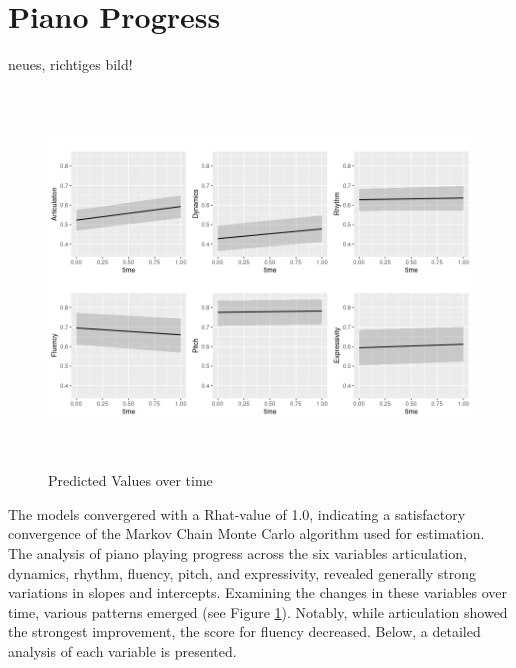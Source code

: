 \section{Piano Progress}
\label{cap:PianoProgress}

neues, richtiges bild!

\begin{figure}[h]
	\centering
	\includegraphics[width=15cm,height=10cm,keepaspectratio]{pred_vals}
	\caption{Predicted Values over time}
	\label{fig:PredVals}
\end{figure}

The models convergered with a Rhat-value of 1.0, indicating a satisfactory convergence of the Markov Chain Monte Carlo algorithm used for estimation. The analysis of piano playing progress across the six variables articulation, dynamics, rhythm, fluency, pitch, and expressivity, revealed generally strong variations in slopes and intercepts. Examining the changes in these variables over time, various patterns emerged (see Figure \ref{fig:PredVals}). Notably, while articulation showed the strongest improvement, the score for fluency decreased. Below, a detailed analysis of each variable is presented. 

